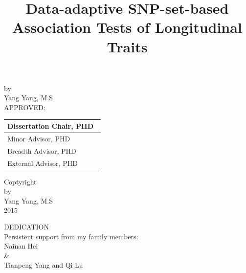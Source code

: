 \documentclass[12pt]{article}
\begin{document}
%
\begin{titlepage}
\title{\normalsize Data-adaptive SNP-set-based Association Tests of Longitudinal Traits}
\date{}
\maketitle

{\normalsize
\begin{center}
by\\[5mm]
Yang Yang, M.S\\[10mm]
APPROVED:\\[10mm]
\end{center}}

\begin{table}[h]
\begin{flushright}
\begin{tabular}{ p{8cm}}

\hline
Dissertation Chair, PHD\ \\[0.8cm]
\hline
Minor Advisor, PHD\\[0.8cm]
\hline
Breadth Advisor, PHD\\[0.8cm]
\hline
External Advisor, PHD\\[0.8cm]


\end{tabular}
\end{flushright}
\label{default}
\end{table}

\thispagestyle{empty}
\pagestyle{empty}
\end{titlepage}

\newpage
\thispagestyle{empty}
\begin{center}
Coptyright\\
by\\
Yang Yang, M.S\\
2015
\end{center}


\newpage
\thispagestyle{empty}
\doublespacing
\begin{center}
DEDICATION\\
Persistent support from my family members:\\
Nainan Hei\\
\&\\
Tianpeng Yang and Qi Lu
\end{center}
\end{document}
